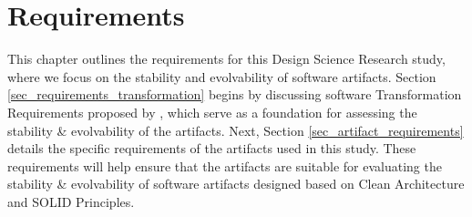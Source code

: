 \section{Requirements} \label{chap_requirements} 

This chapter outlines the requirements for this Design Science Research study, where we
focus on the stability and evolvability of software artifacts. Section
\ref{sec_requirements_transformation} begins by discussing software Transformation
Requirements proposed by \textcite{mannaert_normalized_2016}, which serve as a foundation
for assessing the stability \& evolvability of the artifacts. Next, Section
\ref{sec_artifact_requirements} details the specific requirements of the artifacts used in
this study. These requirements will help ensure that the artifacts are suitable for
evaluating the stability \& evolvability of software artifacts designed based on Clean
Architecture and SOLID Principles.



